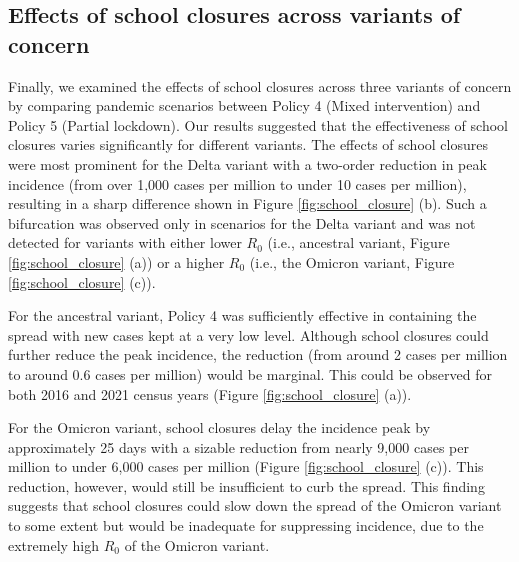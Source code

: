 \documentclass{article}
\begin{document}


\subsection{Effects of school closures across variants of concern}
\label{sec:school}
Finally, we examined the effects of school closures across three variants of concern by comparing pandemic scenarios between Policy 4 (Mixed intervention) and Policy 5 (Partial lockdown).
Our results suggested that the effectiveness of school closures varies significantly for different variants. The effects of school closures were most prominent for the Delta variant with a two-order reduction in peak incidence  (from over 1,000 cases per million to under 10 cases per million), resulting in a sharp difference shown in Figure \ref{fig:school_closure} (b). Such a bifurcation was observed only in scenarios for the Delta variant and was not detected for variants with either lower $R_0$ (i.e., ancestral variant, Figure \ref{fig:school_closure} (a)) or a higher $R_0$ (i.e., the Omicron variant, Figure \ref{fig:school_closure} (c)). 

For the ancestral variant, Policy 4 was sufficiently effective in containing the spread with new cases kept at a very low level. Although school closures could further reduce the peak incidence, the reduction (from around 2 cases per million to around 0.6 cases per million) would be marginal. This could be observed for both 2016 and 2021 census years (Figure \ref{fig:school_closure} (a)). 

For the Omicron variant, school closures delay the incidence peak by approximately 25 days with a sizable reduction from nearly 9,000 cases per million to under 6,000 cases per million (Figure \ref{fig:school_closure} (c)). This reduction, however, would still be insufficient to curb the spread. This finding suggests that school closures could slow down the spread of the Omicron variant to some extent but would be inadequate for suppressing incidence, due to the extremely high $R_0$ of the Omicron variant. 
\end{document}
